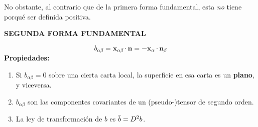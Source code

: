 No obstante, al contrario que de la primera forma fundamental, esta \emph{no} tiene porqué ser definida positiva. 
\begin{mybox}
    \begin{center}
        \textbf{SEGUNDA FORMA FUNDAMENTAL}
    \end{center}
    $$
    b_{\alpha \beta }=\mathbf{x}_{\alpha \beta }\cdot \mathbf{n}=-\mathbf{x}_\alpha \cdot \mathbf{n}_\beta 
    $$
    \textbf{Propiedades:}
    \begin{enumerate}
        \item Si $b_{\alpha \beta }=0$ sobre una cierta carta local, la superficie en esa carta es un \textbf{plano}, y viceversa.
        \item $b_{\alpha \beta} $ son las componentes covariantes de un (pseudo-)tensor de segundo orden.
        \item La ley de transformación de $b$ es $\Bar{b}=D^2b$.
    \end{enumerate}
\end{mybox}
